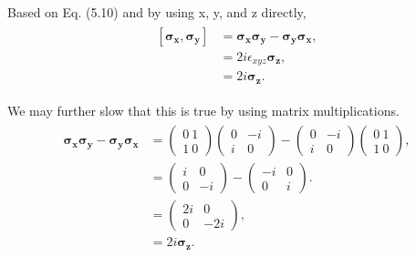 \documentclass{article}
\begin{document}
Based on Eq. (5.10) and by using x, y, and z directly,
\begin{align} \label{eq 5.12}
    \begin{split}
        [\boldsymbol{\sigma_x},\boldsymbol{\sigma_y}]&=\boldsymbol{\sigma_x}\boldsymbol{\sigma_y}-\boldsymbol{\sigma_y}\boldsymbol{\sigma_x},\\
        &= 2i\epsilon_{xyz}\boldsymbol{\sigma_z},\\
        &= 2i\boldsymbol{\sigma_z}. 
    \end{split} \tag{5.12}
\end{align}

We may further slow that this is true by using matrix multiplications.
\begin{align} \label{eq 5.13}
    \begin{split}
        \boldsymbol{\sigma_x}\boldsymbol{\sigma_y}-\boldsymbol{\sigma_y}\boldsymbol{\sigma_x}&=
        \begin{pmatrix}
            0 \ 1 \\ 1\ 0
        \end{pmatrix}
        \begin{pmatrix}
            0 & -i\\ i & 0
        \end{pmatrix}-
        \begin{pmatrix}
            0 &-i\\i&0
        \end{pmatrix}
        \begin{pmatrix}
            0\ 1\\ 1\ 0
        \end{pmatrix},\\
        &=\begin{pmatrix}
            i &0\\0& -i
        \end{pmatrix}-
        \begin{pmatrix}
            -i& 0\\0&i
        \end{pmatrix}.\\
        &=\begin{pmatrix}
            2i&0\\0&-2i
        \end{pmatrix},\\
        &=2i\boldsymbol{\sigma_z}.
    \end{split} \tag{5.13}
\end{align}
\end{document}
